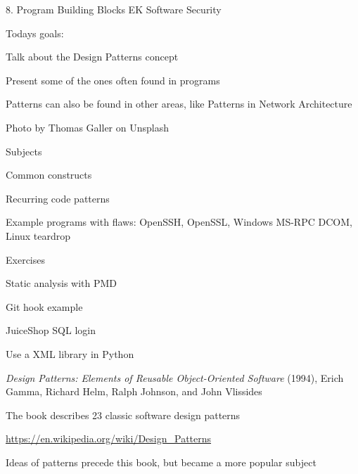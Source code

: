 \documentclass[Screen16to9,17pt]{foils}
\begin{document}
\mytitlepage
{8. Program Building Blocks}
{EK  Software Security}




Todays goals:
\begin{list2}
\item Talk about the Design Patterns concept
\item Present some of the ones often found in programs
\item Patterns can also be found in other areas, like Patterns in Network Architecture
\end{list2}

  Photo by Thomas Galler on Unsplash


\begin{list1}
\item Subjects
\begin{list2}
\item Common constructs
\item Recurring code patterns
\item Example programs with flaws: OpenSSH, OpenSSL, Windows MS-RPC DCOM, Linux teardrop
\end{list2}
\item Exercises
\begin{list2}
\item Static analysis with PMD
\item Git hook example
\item JuiceShop SQL login
\item Use a XML library in Python
\end{list2}
\end{list1}


\begin{list1}
\item 
\end{list1}




\begin{list2}
\item \emph{Design Patterns: Elements of Reusable Object-Oriented Software} (1994), Erich Gamma, Richard Helm, Ralph Johnson, and John Vlissides

\item The book describes 23 classic software design patterns

\item \url{https://en.wikipedia.org/wiki/Design_Patterns}

\item Ideas of patterns precede this book, but became a more popular subject
\end{list2}
\end{document}
